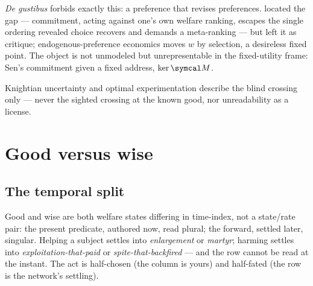 \documentclass[../main]{subfiles}
\begin{document}
\begin{econ}[label=e:commitment, title={Commitment, given a fixed address}, ref=op:vmoral,
  cites={a:degustibus,a:senrational,a:bowlesgintis}, departs=freeze,
  stopsat={carries the preference-revising preference as selection, never as a will}]
  \emph{De gustibus} \parencite{a:degustibus} forbids exactly this: a preference that revises
  preferences. \textcite{a:senrational} located the gap --- commitment, acting against one's
  own welfare ranking, escapes the single ordering revealed choice recovers and demands a
  meta-ranking --- but left it as critique; endogenous-preference economics
  \parencite{a:bowlesgintis} moves $w$ by selection, a desireless fixed point. The object is
  not unmodeled but unrepresentable in the fixed-utility frame: Sen's commitment given a fixed
  address, $\ker\readout$.
\end{econ}

\begin{econ}[label=e:license, title={The blind crossing, never the sighted}, ref=dyn:bif,
  cites={a:knight,a:weitzman}, departs=annex,
  stopsat={describes the blind crossing only; never the sighted good, nor unreadability as license}]
  Knightian uncertainty \parencite{a:knight} and optimal experimentation
  \parencite{a:weitzman} describe the blind crossing only --- never the sighted crossing at
  the known good, nor unreadability as a license.
\end{econ}

\clearpage
\section{Good versus wise}
\label{sec:good-wise}

\subsection{The temporal split}
\label{subsec:gw:temporal}
%
Good and wise are both welfare states differing in time-index, not a state/rate pair:
 the present predicate, authored now, read plural;  the forward,
settled later, singular. Helping a subject settles into \emph{enlargement} or \emph{martyr};
harming settles into \emph{exploitation-that-paid} or \emph{spite-that-backfired} --- and
the row cannot be read at the instant. The act is half-chosen (the column is yours) and
half-fated (the row is the network's settling).
\end{document}

